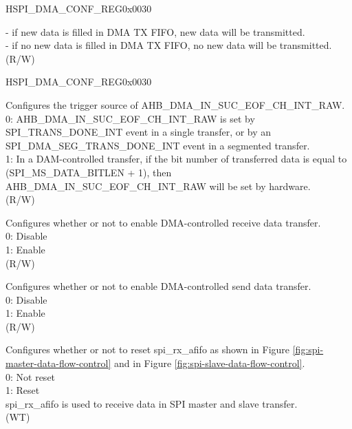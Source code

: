\begin{register}{H}{SPI\_DMA\_CONF\_REG}{0x0030}
\begin{regdesc}
\begin{reglist}
        - if new data is filled in DMA TX FIFO, new data will be transmitted. \\
        - if no new data is filled in DMA TX FIFO, no new data will be transmitted. \\
 (R/W)
\item [Continued on the next page...]
\end{reglist}\end{regdesc}
\end{register}

\addtocounter{Regfloat}{-1}
\begin{register}{H}{SPI\_DMA\_CONF\_REG}{0x0030}
\begin{regdesc}\begin{reglist}
\item [Continued from the previous page...]
\label{fielddesc:SPIRXEOFEN}\item [SPI\_RX\_EOF\_EN] Configures the trigger source of AHB\_DMA\_IN\_SUC\_EOF\_CH\_INT\_RAW.\\
0: AHB\_DMA\_IN\_SUC\_EOF\_CH\_INT\_RAW is set by SPI\_TRANS\_DONE\_INT event in a single transfer, or by an SPI\_DMA\_SEG\_TRANS\_DONE\_INT event in a segmented transfer. \\
1: In a DAM-controlled transfer, if the bit number of transferred data is equal to (SPI\_MS\_DATA\_BITLEN + 1), then AHB\_DMA\_IN\_SUC\_EOF\_CH\_INT\_RAW will be set by hardware.\\
(R/W)
\label{fielddesc:SPIDMARXENA}\item [SPI\_DMA\_RX\_ENA] Configures whether or not to enable DMA-controlled receive data transfer.\\
0: Disable\\
1: Enable\\ (R/W)
\label{fielddesc:SPIDMATXENA}\item [SPI\_DMA\_TX\_ENA] Configures whether or not to enable DMA-controlled send data transfer.\\
0: Disable\\
1: Enable\\ (R/W)
\label{fielddesc:SPIRXAFIFORST}\item [SPI\_RX\_AFIFO\_RST] Configures whether or not to reset spi\_rx\_afifo as shown in Figure \ref{fig:spi-master-data-flow-control} and in Figure \ref{fig:spi-slave-data-flow-control}.\\
0: Not reset\\
1: Reset\\
spi\_rx\_afifo is used to receive data in SPI master and slave transfer. \\ (WT)

\end{reglist}
\end{regdesc}
\end{register}
